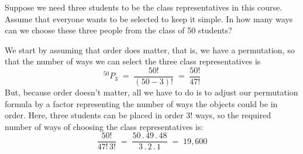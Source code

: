 \begin{figure}[htbp]\label{F:TwoAndThreeBlocksNorthEast}
\centering{}
\end{figure}


\begin{Exercise}[title={Choosing Volunteers},label={xChoose3of50}]
Suppose we need three students to be the class representatives in this course.
Assume that everyone wants to be selected to keep it simple.
In how many ways can we choose these three people from the class of 50 students?
\end{Exercise}
\begin{Answer}
We start by assuming that order does matter, that is, we have a
permutation, so that the number of ways we can select the three class
representatives is
\[^{50}P_3\;=\; \frac{50!}{(50-3)!}\;=\; \frac{50!}{47!}\]
But, because order doesn't matter,  all we have to do is to adjust our
permutation formula by a factor representing the number of  ways the objects could be in
order. Here,  three students can  be placed in order $3!$ ways, so
the required number of  ways of choosing the class representatives is:
\[ \frac{50!}{47!\, 3!}\;=\;
\frac{50\,.\, 49\,.\,48}{3\,.\,2\,.\,1}\;=\; 19,600\]
\end{Answer}

